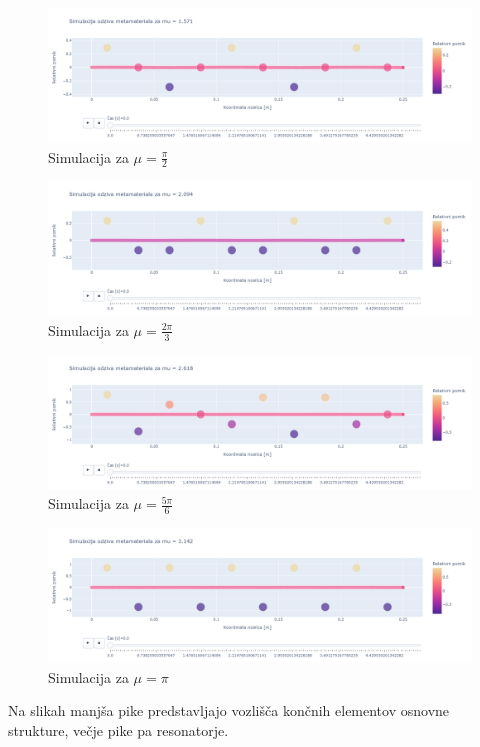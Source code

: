 \documentclass[12pt]{report}
\begin{document}
\begin{figure}[H]
  \centering
  \includegraphics[trim={0 4cm 0 3.5cm},clip, scale=0.3]{Images/mupi_2.png}
  \caption{Simulacija za $\mu = \frac{\pi}{2}$}
\end{figure}
\begin{figure}[H]
  \centering
  \includegraphics[trim={0 4cm 0 3.5cm},clip, scale=0.3]{Images/mu2pi_3.png}
  \caption{Simulacija za $\mu = \frac{2\pi}{3}$}
\end{figure}
\begin{figure}[H]
  \centering
  \includegraphics[trim={0 4cm 0 3.5cm},clip, scale=0.3]{Images/mu5pi_6.png}
  \caption{Simulacija za $\mu = \frac{5\pi}{6}$}
\end{figure}
\begin{figure}[H]
  \centering
  \includegraphics[trim={0 4cm 0 3.5cm},clip, scale=0.3]{Images/mupi.png}
  \caption{Simulacija za $\mu = \pi$}
\end{figure}
\noindent Na slikah manjša pike predstavljajo vozlišča končnih elementov osnovne strukture, večje pike pa resonatorje.
\end{document}
